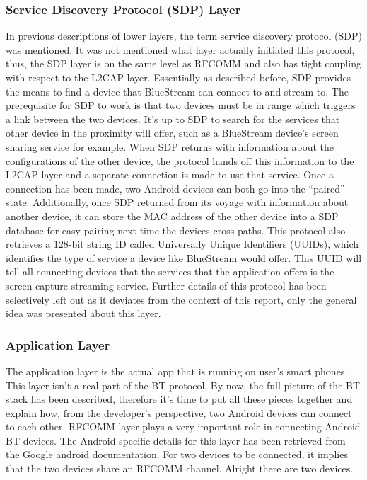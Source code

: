 \documentclass[a4paper,12pt]{article}
\begin{document}
\subsubsection{Service Discovery Protocol (SDP) Layer}
In previous descriptions of lower layers, the term service discovery protocol (SDP) was mentioned. It was not mentioned what layer actually initiated this protocol, thus, the SDP layer is on the same level as RFCOMM and also has tight coupling with respect to the L2CAP layer. Essentially as described before, SDP provides the means to find a device that BlueStream can connect to and stream to. The prerequisite for SDP to work is that two devices must be in range which triggers a link between the two devices. It’s up to SDP to search for the services that other device in the proximity will offer, such as a BlueStream device’s screen sharing service for example. When SDP returns with information about the configurations of the other device, the protocol hands off this information to the L2CAP layer and a separate connection is made to use that service. Once a connection has been made, two Android devices can both go into the “paired” state. Additionally, once SDP returned from its voyage with information about another device, it can store the MAC address of the other device into a SDP database for easy pairing next time the devices cross paths. This protocol also retrieves a 128-bit string ID called Universally Unique Identifiers (UUIDs), which identifies the type of service a device like BlueStream would offer. This UUID will tell all connecting devices that the services that the application offers is the screen capture streaming service. Further details of this protocol has been selectively left out as it deviates from the context of this report, only the general idea was presented about this layer. 

\subsubsection{Application Layer}
The application layer is the actual app that is running on user’s smart phones. This layer isn’t a real part of the BT protocol. By now, the full picture of the BT stack has been described, therefore it's time to put all these pieces together and explain how, from the developer's perspective, two Android devices can connect to each other. RFCOMM layer plays a very important role in connecting Android BT devices. The Android specific details for this layer has been retrieved from the Google android documentation\cite{DevelopersAndroid}. For two devices to be connected, it implies that the two devices share an RFCOMM channel. Alright there are two devices.
\end{document}
